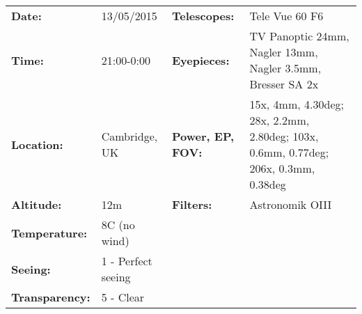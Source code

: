 \begin{tabular}{ p{0.9in} p{1.3in} p{1.2in} p{5.2in}}
{\bf Date:} & 13/05/2015 & {\bf Telescopes:} & Tele Vue 60 F6 \\ 
{\bf Time:} & 21:00-0:00 & {\bf Eyepieces:} & TV Panoptic 24mm, Nagler 13mm, Nagler 3.5mm, Bresser SA 2x \\ 
{\bf Location:} & Cambridge, UK & {\bf Power, EP, FOV:} & 15x, 4mm, 4.30deg; 28x, 2.2mm, 2.80deg; 103x, 0.6mm, 0.77deg; 206x, 0.3mm, 0.38deg \\ 
{\bf Altitude:} & 12m & {\bf Filters:} & Astronomik OIII \\ 
{\bf Temperature:} & 8C (no wind) & & \\ 
{\bf Seeing:} & 1 - Perfect seeing & & \\ 
{\bf Transparency:} & 5 - Clear & & \\ 
\end{tabular}
\centering 
